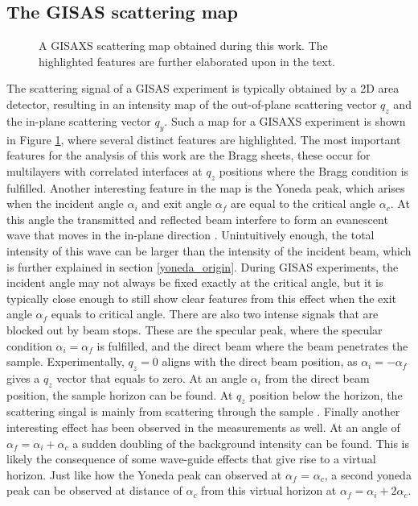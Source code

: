 \subsection{The GISAS scattering map}
\begin{figure}
	\centering
	\def\svgwidth{\textwidth}
	
	\caption{A GISAXS scattering map obtained during this work. The highlighted features are further elaborated upon in the text.}
	\label{gisaxs_features}
\end{figure}
The scattering signal of a GISAS experiment is typically obtained by a 2D area detector, resulting in an intensity map of the out-of-plane scattering vector $q_z$ and the in-plane scattering vector $q_y$. Such a map for a GISAXS experiment is shown in Figure \ref{gisaxs_features}, where several distinct features are highlighted. The most important features for the analysis of this work are the Bragg sheets, these occur for multilayers with correlated interfaces at $q_z$ positions where the Bragg condition is fulfilled. Another interesting feature in the map is the Yoneda peak, which arises when the incident angle $\alpha_i$ and exit angle $\alpha_f$ are equal to the critical angle $\alpha_c$. At this angle the transmitted and reflected beam interfere to form an evanescent wave that moves in the in-plane direction \cite{matthias_GISAXS}. Unintuitively enough, the total intensity of this wave can be larger than the intensity of the incident beam, which is further explained in section \ref{yoneda_origin}. During GISAS experiments, the incident angle may not always be fixed exactly at the critical angle, but it is typically close enough to still show clear features from this effect when the exit angle $\alpha_f$ equals to critical angle. There are also two intense signals that are blocked out by beam stops. These are the specular peak, where the specular condition $\alpha_i= \alpha_f$ is fulfilled, and the direct beam where the beam penetrates the sample. Experimentally, $q_z = 0$ aligns with the direct beam position, as $\alpha_i = -\alpha_f$ gives a $q_z$ vector that equals to zero. At an angle $\alpha_i$ from the direct beam position, the sample horizon can be found. At $q_z$ position below the horizon, the scattering singal is mainly from scattering through the sample \cite{GISAXS_santoro}. Finally another interesting effect has been observed in the measurements as well. At an angle of $\alpha_f = \alpha_i + \alpha_c$ a sudden doubling of the background intensity can be found. This is likely the consequence of some wave-guide effects that give rise to a virtual horizon. Just like how the Yoneda peak can observed at $\alpha_f$ = $\alpha_c$, a second yoneda peak can be observed at distance of $\alpha_c$ from this virtual horizon at $\alpha_f = \alpha_i + 2\alpha_c$.

